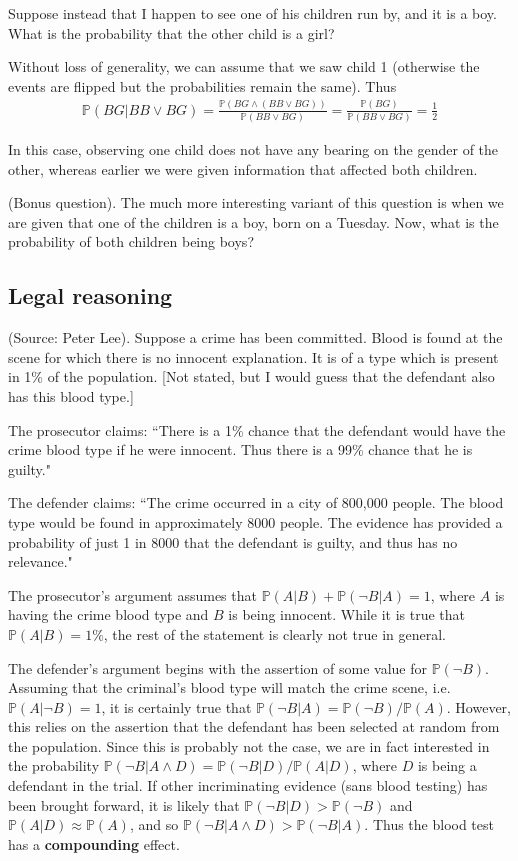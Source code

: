 \documentclass{article}
\begin{document}
Suppose instead that I happen to see one of his children run by, and it is a boy. What is the probability that the other child is a girl?

Without loss of generality, we can assume that we saw child 1 (otherwise the events are flipped but the probabilities remain the same). Thus
\begin{gather*}
\mathbb{P}(BG | BB \lor BG) = \frac{\mathbb{P}(BG \land (BB \lor BG))}{\mathbb{P}(BB \lor BG)} = \frac{\mathbb{P}(BG)}{\mathbb{P}(BB \lor BG)} = \frac{1}{2}
\end{gather*}

In this case, observing one child does not have any bearing on the gender of the other, whereas earlier we were given information that affected both children.

(Bonus question). The much more interesting variant of this question is when we are given that one of the children is a boy, born on a Tuesday. Now, what is the probability of both children being boys?

\subsection{Legal reasoning}
(Source: Peter Lee). Suppose a crime has been committed. Blood is found at the scene for which there is no innocent explanation. It is of a type which is present in 1\% of the population. [Not stated, but I would guess that the defendant also has this blood type.]

The prosecutor claims: ``There is a 1\% chance that the defendant would have the crime blood type if he were innocent. Thus there is a 99\% chance that he is guilty."

The defender claims: ``The crime occurred in a city of 800,000 people. The blood type would be found in approximately 8000 people. The evidence has provided a probability of just 1 in 8000 that the defendant is guilty, and thus has no relevance."

The prosecutor's argument assumes that $\mathbb{P}(A|B) + \mathbb{P}(\neg B|A) = 1$, where $A$ is having the crime blood type and $B$ is being innocent. While it is true that $\mathbb{P}(A|B)=1\%$, the rest of the statement is clearly not true in general.

The defender's argument begins with the assertion of some value for $\mathbb{P}(\neg B)$. Assuming that the criminal's blood type will match the crime scene, i.e. $\mathbb{P}(A|\neg B) = 1$, it is certainly true that $\mathbb{P}(\neg B|A) = \mathbb{P}(\neg B)/\mathbb{P}(A)$. However, this relies on the assertion that the defendant has been selected at random from the population. Since this is probably not the case, we are in fact interested in the probability $\mathbb{P}(\neg B|A \land D) = \mathbb{P}(\neg B| D)/\mathbb{P}(A|D)$, where $D$ is being a defendant in the trial. If other incriminating evidence (sans blood testing) has been brought forward, it is likely that $\mathbb{P}(\neg B|D) > \mathbb{P}(\neg B)$ and $\mathbb{P}(A|D) \approx \mathbb{P}(A)$, and so $\mathbb{P}(\neg B|A \land D) > \mathbb{P}(\neg B|A)$. Thus the blood test has a \textbf{compounding} effect.
\end{document}
